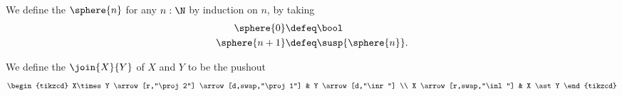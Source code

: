 \begin{defn}
We define the  $\sphere{n}$ for any $n:\N$ by induction on $n$, by taking
\begin{align*}
\sphere{0} & \defeq \bool \\
\sphere{n+1} & \defeq \susp{\sphere{n}}.
\end{align*}
\end{defn}

\begin{defn}
We define the  $\join{X}{Y}$ of $X$ and $Y$ to be the pushout 
\begin{equation*}
\begin{tikzcd}
X\times Y \arrow[r,"\proj 2"] \arrow[d,swap,"\proj 1"] & Y \arrow[d,"\inr"] \\
X \arrow[r,swap,"\inl"] & X \ast Y 
\end{tikzcd}
\end{equation*}
\end{defn}

